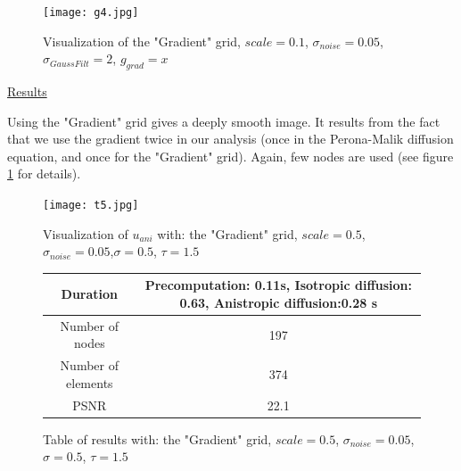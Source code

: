 \documentclass{report}
\begin{document}
       \begin{figure}[h!]
       
        \centering
        \caption{Visualization of the "Gradient" grid, $scale=0.1$, $\sigma_{noise}=0.05$, $\sigma_{GaussFilt}=2$,  $g_{grad}=x$}
        \texttt{[image: g4.jpg]}
        \end{figure}
        


\underline{Results}

Using the "Gradient" grid gives a deeply smooth image. It results from the fact that we use the gradient twice in our analysis (once in the Perona-Malik diffusion equation, and once for the "Gradient" grid). Again, few nodes are used (see figure \ref{T5} for details). 




        \begin{figure}[h!]
        
        \centering
        \caption{Visualization of $u_{ani}$ with: the "Gradient" grid, $scale=0.5$, $\sigma_{noise}=0.05$,$\sigma=0.5$, $\tau=1.5$}
        \texttt{[image: t5.jpg]}
        \end{figure}






        \begin{figure}[h!]
        \centering
        \caption{Table of results with: the "Gradient" grid, $scale=0.5$, $\sigma_{noise}=0.05$,$\sigma=0.5$, $\tau=1.5$}
        \label{T5}
        \begin{tabular}{|c|c|}
          \hline
         Duration &  Precomputation: 0.11s,
         Isotropic diffusion: 0.63,
         Anistropic diffusion:0.28 s   \\
        \hline
         Number of nodes & 197 \\
         \hline
         Number of elements & 374\\
 
         \hline
         PSNR & 22.1 \\
         \hline
        \end{tabular}
        \end{figure}
\end{document}
